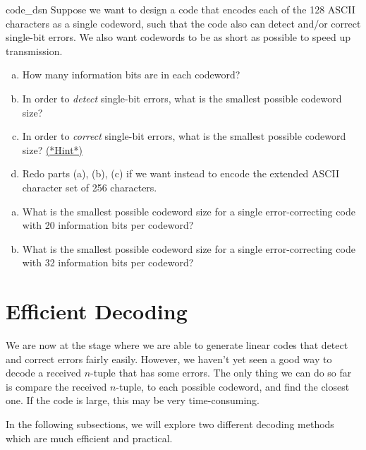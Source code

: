  \begin{exercise}{code_dsn}
 Suppose we want to design a code that encodes each of the 128 ASCII characters as a single codeword, such that the code also can detect and/or correct single-bit errors. We also want codewords to be as short as possible to speed up transmission. 
 \begin{enumerate}[(a)]
 \item
 How many information bits are in each codeword?
 \item
 In order to \emph{detect} single-bit errors, what is the smallest possible codeword size?
\item
 In order to \emph{correct} single-bit errors, what is the smallest possible codeword size?  \hyperref[sec:algcodes:hints]{(*Hint*)}

\item
Redo parts (a), (b), (c) if we want instead to encode the extended ASCII character set of 256 characters.
\end{enumerate}
\end{exercise}

\begin{exercise}{}
\begin{enumerate}[(a)]
\item
What is the smallest possible codeword size for a single error-correcting code with 20 information bits per codeword? 
\item
What is the smallest possible codeword size for a single error-correcting code with 32 information bits per codeword? 
\end{enumerate}
\end{exercise}

\section{Efficient Decoding}
\label{sec:ErrorAndCorrectionCode:EfficientDecoding}
 
 
We are now at the stage where we are able to generate linear codes
that detect and correct errors fairly easily. However, we haven't yet seen  a good way 
 to decode a received $n$-tuple that has some errors. The only thing we can do so far is compare  the received $n$-tuple, 
to each possible codeword, and find the closest one.
If the code is large, this may be very time-consuming. 

In the following subsections, we will explore two different decoding methods which are much efficient and practical.
 
